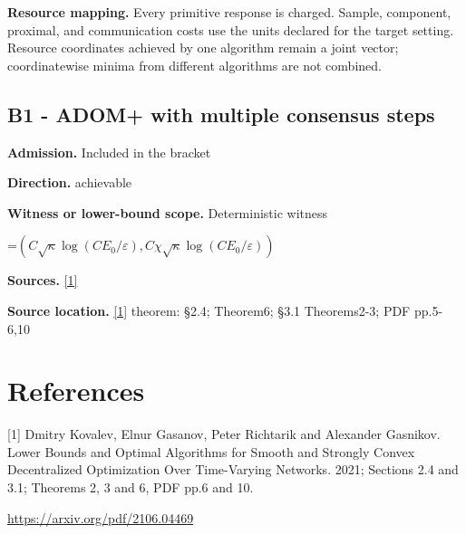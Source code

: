 \documentclass[10pt,a4paper]{article}
\newcommand{\AtlasMath}[1]{\par\begingroup\centering\setbox0=\hbox{$\displaystyle #1$}\ifdim\wd0>1.4\linewidth\typeout{ATLAS WIDE FORMULA: \the\wd0}\fi\ifdim\wd0>\linewidth\resizebox{\linewidth}{!}{\box0}\else\box0\fi\par\endgroup}
\begin{document}
\textbf{Resource mapping.} Every primitive response is charged. Sample, component, proximal, and communication costs use the units declared for the target setting. Resource coordinates achieved by one algorithm remain a joint vector; coordinatewise minima from different algorithms are not combined.

\subsection{B1 - ADOM+ with multiple consensus steps}
\textbf{Admission.} Included in the bracket

\textbf{Direction.} achievable

\textbf{Witness or lower-bound scope.} Deterministic witness

\AtlasMath{(C\sqrt\kappa\log(CE_0/\varepsilon),C\chi\sqrt\kappa\log(CE_0/\varepsilon))}
\textbf{Sources.} \href{https://arxiv.org/pdf/2106.04469}{[1]}

\textbf{Source location.} \href{https://arxiv.org/pdf/2106.04469}{[1]} theorem: §2.4; Theorem6; §3.1 Theorems2-3; PDF pp.5-6,10

\section{References}
[1] Dmitry Kovalev, Elnur Gasanov, Peter Richtarik and Alexander Gasnikov. Lower Bounds and Optimal Algorithms for Smooth and Strongly Convex Decentralized Optimization Over Time-Varying Networks. 2021; Sections 2.4 and 3.1; Theorems 2, 3 and 6, PDF pp.6 and 10.

\url{https://arxiv.org/pdf/2106.04469}
\end{document}
